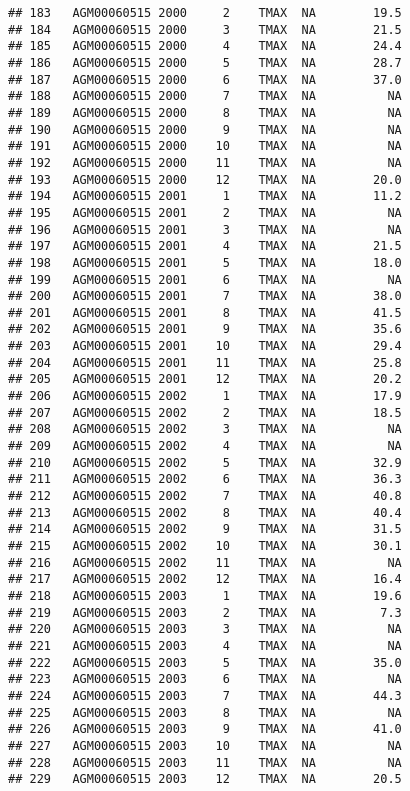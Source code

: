 \documentclass{article}\usepackage[]{graphicx}\usepackage[]{color}
\makeatletter
\newenvironment{kframe}{%
 \def\at@end@of@kframe{}%
 \ifinner\ifhmode%
  \def\at@end@of@kframe{\end{minipage}}%
  \begin{minipage}{\columnwidth}%
 \fi\fi%
 \def\FrameCommand##1{\hskip\@totalleftmargin \hskip-\fboxsep
 \colorbox{shadecolor}{##1}\hskip-\fboxsep
     \hskip-\linewidth \hskip-\@totalleftmargin \hskip\columnwidth}%
 \MakeFramed {\advance\hsize-\width
   \@totalleftmargin\z@ \linewidth\hsize
   \@setminipage}}%
 {\par\unskip\endMakeFramed%
 \at@end@of@kframe}
\newenvironment{knitrout}{}{} %
\makeatother
\begin{document}
\begin{knitrout}
\begin{kframe}
\begin{verbatim}
## 183   AGM00060515 2000     2    TMAX  NA        19.5
## 184   AGM00060515 2000     3    TMAX  NA        21.5
## 185   AGM00060515 2000     4    TMAX  NA        24.4
## 186   AGM00060515 2000     5    TMAX  NA        28.7
## 187   AGM00060515 2000     6    TMAX  NA        37.0
## 188   AGM00060515 2000     7    TMAX  NA          NA
## 189   AGM00060515 2000     8    TMAX  NA          NA
## 190   AGM00060515 2000     9    TMAX  NA          NA
## 191   AGM00060515 2000    10    TMAX  NA          NA
## 192   AGM00060515 2000    11    TMAX  NA          NA
## 193   AGM00060515 2000    12    TMAX  NA        20.0
## 194   AGM00060515 2001     1    TMAX  NA        11.2
## 195   AGM00060515 2001     2    TMAX  NA          NA
## 196   AGM00060515 2001     3    TMAX  NA          NA
## 197   AGM00060515 2001     4    TMAX  NA        21.5
## 198   AGM00060515 2001     5    TMAX  NA        18.0
## 199   AGM00060515 2001     6    TMAX  NA          NA
## 200   AGM00060515 2001     7    TMAX  NA        38.0
## 201   AGM00060515 2001     8    TMAX  NA        41.5
## 202   AGM00060515 2001     9    TMAX  NA        35.6
## 203   AGM00060515 2001    10    TMAX  NA        29.4
## 204   AGM00060515 2001    11    TMAX  NA        25.8
## 205   AGM00060515 2001    12    TMAX  NA        20.2
## 206   AGM00060515 2002     1    TMAX  NA        17.9
## 207   AGM00060515 2002     2    TMAX  NA        18.5
## 208   AGM00060515 2002     3    TMAX  NA          NA
## 209   AGM00060515 2002     4    TMAX  NA          NA
## 210   AGM00060515 2002     5    TMAX  NA        32.9
## 211   AGM00060515 2002     6    TMAX  NA        36.3
## 212   AGM00060515 2002     7    TMAX  NA        40.8
## 213   AGM00060515 2002     8    TMAX  NA        40.4
## 214   AGM00060515 2002     9    TMAX  NA        31.5
## 215   AGM00060515 2002    10    TMAX  NA        30.1
## 216   AGM00060515 2002    11    TMAX  NA          NA
## 217   AGM00060515 2002    12    TMAX  NA        16.4
## 218   AGM00060515 2003     1    TMAX  NA        19.6
## 219   AGM00060515 2003     2    TMAX  NA         7.3
## 220   AGM00060515 2003     3    TMAX  NA          NA
## 221   AGM00060515 2003     4    TMAX  NA          NA
## 222   AGM00060515 2003     5    TMAX  NA        35.0
## 223   AGM00060515 2003     6    TMAX  NA          NA
## 224   AGM00060515 2003     7    TMAX  NA        44.3
## 225   AGM00060515 2003     8    TMAX  NA          NA
## 226   AGM00060515 2003     9    TMAX  NA        41.0
## 227   AGM00060515 2003    10    TMAX  NA          NA
## 228   AGM00060515 2003    11    TMAX  NA          NA
## 229   AGM00060515 2003    12    TMAX  NA        20.5

\end{verbatim}
\end{kframe}
\end{knitrout}
\end{document}
